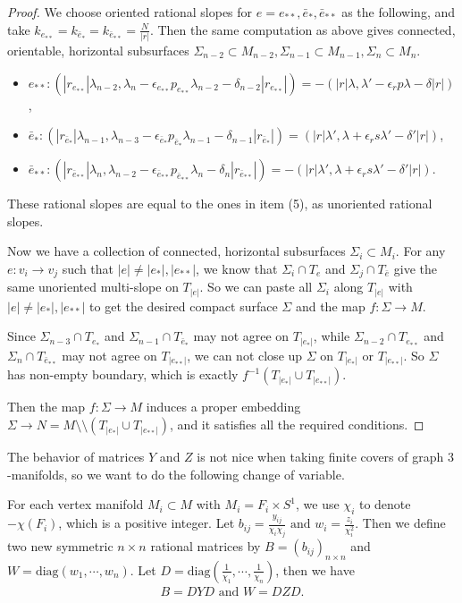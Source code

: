 \documentclass{amsart}
\numberwithin{equation}{section}
\theoremstyle{definition}
\begin{document}
\begin{proof}
We choose oriented rational slopes for $e=e_{**},\bar{e}_{*},\bar{e}_{**}$ as the following, and take $k_{e_{**}}=k_{\bar{e}_{*}}=k_{\bar{e}_{**}}=\frac{N}{|r|}$. Then the same computation as above gives connected, orientable, horizontal subsurfaces $\Sigma_{n-2}\subset M_{n-2}, \Sigma_{n-1}\subset M_{n-1},\Sigma_n\subset M_n$.
\begin{itemize}
\item $e_{**}: (|r_{e_{**}}|\lambda_{n-2},\lambda_n-\epsilon_{e_{**}}p_{e_{**}}\lambda_{n-2}-\delta_{n-2}|r_{e_{**}}|)=-(|r|\lambda,\lambda'-\epsilon_r p\lambda-\delta|r|)$,
\item $\bar{e}_*: (|r_{\bar{e}_{*}}|\lambda_{n-1},\lambda_{n-3}-\epsilon_{\bar{e}_{*}}p_{\bar{e}_{*}}\lambda_{n-1}-\delta_{n-1}|r_{\bar{e}_{*}}|)=(|r|\lambda',\lambda+\epsilon_r s\lambda'-\delta'|r|)$,
\item $\bar{e}_{**}: (|r_{\bar{e}_{**}}|\lambda_{n},\lambda_{n-2}-\epsilon_{\bar{e}_{**}}p_{\bar{e}_{**}}\lambda_{n}-\delta_{n}|r_{\bar{e}_{**}}|)=-(|r|\lambda',\lambda+\epsilon_r s\lambda'-\delta'|r|)$.
\end{itemize}
These rational slopes are equal to the ones in item (5), as unoriented rational slopes.

Now we have a collection of connected, horizontal subsurfaces $\Sigma_i\subset M_i$. For any $e:v_i\to v_j$ such that $|e|\ne |e_*|,|e_{**}|$, we know that $\Sigma_i\cap T_e$ and $\Sigma_j\cap T_{\bar{e}}$ give the same unoriented multi-slope on $T_{|e|}$. So we can paste all $\Sigma_i$ along $T_{|e|}$ with $|e|\ne |e_*|,|e_{**}|$ to get the desired compact surface $\Sigma$ and the map $f:\Sigma\to M$. 

Since $\Sigma_{n-3}\cap T_{e_*}$ and $\Sigma_{n-1}\cap T_{\bar{e}_*}$ may not agree on $T_{|e_*|}$, while $\Sigma_{n-2}\cap T_{e_{**}}$ and $\Sigma_n\cap T_{\bar{e}_{**}}$ may not agree on $T_{|e_{**}|}$, we can not close up $\Sigma$ on $T_{|e_*|}$ or $T_{|e_{**}|}$. So $\Sigma$ has non-empty boundary, which is exactly $f^{-1}(T_{|e_*|}\cup T_{|e_{**}|})$.

Then the map $f:\Sigma\to M$ induces a proper embedding $\Sigma\to N=M\setminus \setminus (T_{|e_*|}\cup T_{|e_{**}|})$, and it satisfies all the required conditions.
\end{proof}

The behavior of matrices $Y$ and $Z$ is not nice when taking finite covers of graph $3$-manifolds, so we want to do the following change of variable. 

For each vertex manifold $M_i\subset M$ with $M_i=F_i\times S^1$, we use $\chi_i $ to denote $-\chi(F_i)$, which is a positive integer. Let $b_{ij}=\frac{y_{ij}}{\chi_i\chi_j}\text{\ and\ }w_i=\frac{z_i}{\chi_i^2}$. Then we define two new symmetric $n\times n$ rational matrices by
$B=(b_{ij})_{n\times n}$ and $W=\text{diag}(w_1,\cdots,w_n).$ Let $D=\text{diag}(\frac{1}{\chi_1},\cdots,\frac{1}{\chi_n})$, then we have 
\begin{align}\label{5.7}
B=DYD\text{\ and \ } W=DZD.
\end{align}
\end{document}
